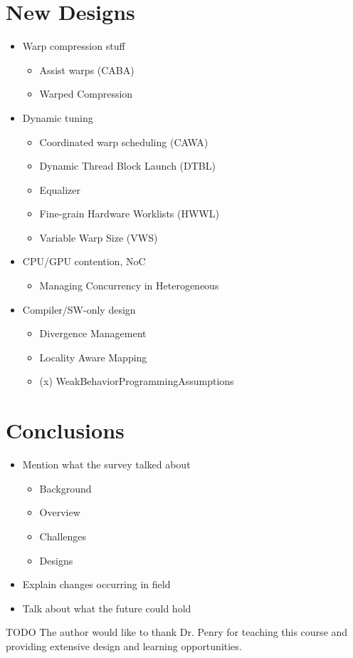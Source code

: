 \documentclass[prodmode,acmtecs]{acmsmall} %
\begin{document}
\section{New Designs} \label{sec:research}
\begin{itemize}
\item Warp compression stuff
  \begin{itemize}
  \item Assist warps (CABA)
  \item Warped Compression
  \end{itemize}
\item Dynamic tuning
  \begin{itemize}
  \item Coordinated warp scheduling (CAWA)
  \item Dynamic Thread Block Launch (DTBL)
  \item Equalizer
  \item Fine-grain Hardware Worklists (HWWL)
  \item Variable Warp Size (VWS)
  \end{itemize}
\item CPU/GPU contention, NoC
  \begin{itemize}
  \item Managing Concurrency in Heterogeneous
  \end{itemize}
\item Compiler/SW-only design
  \begin{itemize}
  \item Divergence Management
  \item Locality Aware Mapping
  \item (x) WeakBehaviorProgrammingAssumptions
  \end{itemize}
\end{itemize}

\section{Conclusions} \label{sec:conclusions}
\begin{itemize}
\item Mention what the survey talked about
  \begin{itemize}
  \item Background
  \item Overview
  \item Challenges
  \item Designs
  \end{itemize}
\item Explain changes occurring in field
\item Talk about what the future could hold
\end{itemize}

\begin{acks}
TODO The author would like to thank Dr. Penry for teaching this course and
providing extensive design and learning opportunities.
\end{acks}

% 
% 

\end{document}
